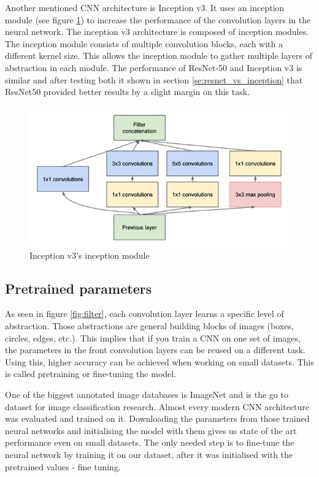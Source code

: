 \documentclass[times, utf8, diplomski]{fer}
\begin{document}
Another mentioned CNN architecture is Inception v3. It uses an inception module (see figure \ref{fig:inception_module}) to increase the performance of the convolution layers in the neural network. The inception v3 architecture is composed of inception modules. The inception module consists of multiple convolution blocks, each with a different kernel size. This allows the inception module to gather multiple layers of abstraction in each module. The performance of ResNet-50 and Inception v3 is similar and after testing both it shown in section \ref{se:resnet_vs_inception} that  ResNet50 provided better results by a slight margin on this task.

\begin{figure}
  \includegraphics[scale=0.7]{figures/inception_module.png}
  \centering
  \caption{Inception v3's inception module}
  \label{fig:inception_module}
\end{figure}


\subsection{Pretrained parameters}
\label{se:pretrained_parameters}
As seen in figure \ref{fig:filter}, each convolution layer learns a specific level of abstraction. Those abstractions are general building blocks of images (boxes, circles, edges, etc.). This implies that if you train a CNN on one set of images, the parameters in the front convolution layers can be reused on a different task. Using this, higher accuracy can be achieved when working on small datasets. This is called pretraining or fine-tuning the model.

One of the biggest annotated image databases is ImageNet \citep{imagenet} and is the go to dataset for image classification research. Almost every modern CNN architecture was evaluated and trained on it. Downloading the parameters from those trained neural networks and initialising the model with them gives us state of the art performance even on small datasets. The only needed step is to fine-tune the neural network by training it on our dataset, after it was initialised with the pretrained values - fine tuning.
\end{document}
